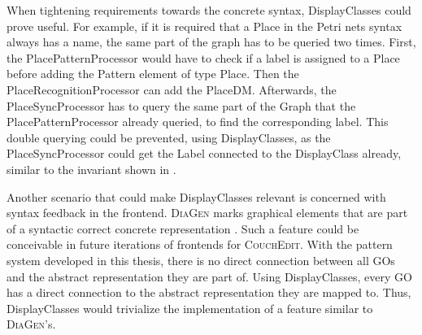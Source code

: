 When tightening requirements towards the concrete syntax, DisplayClasses could prove useful. For example, if it is required that a Place in the Petri nets syntax always has a name, the same part of the graph has to be queried two times. First, the PlacePatternProcessor would have to check if a label is assigned to a Place before adding the Pattern element of type Place. Then the PlaceRecognitionProcessor can add the PlaceDM. Afterwards, the PlaceSyncProcessor has to query the same part of the Graph that the PlacePatternProcessor already queried, to find the corresponding label. This double querying could be prevented, using DisplayClasses, as the PlaceSyncProcessor could get the Label connected to the DisplayClass already, similar to the invariant shown in .

Another scenario that could make DisplayClasses relevant is concerned with syntax feedback in the frontend. \textsc{DiaGen} marks graphical elements that are part of a syntactic correct concrete representation \cite{minas_concepts_2002}. Such a feature could be conceivable in future iterations of frontends for \textsc{CouchEdit}. With the pattern system developed in this thesis, there is no direct connection between all GOs and the abstract representation they are part of. Using DisplayClasses, every GO has a direct connection to the abstract representation they are mapped to. Thus, DisplayClasses would trivialize the implementation of a feature similar to \textsc{DiaGen}'s.



